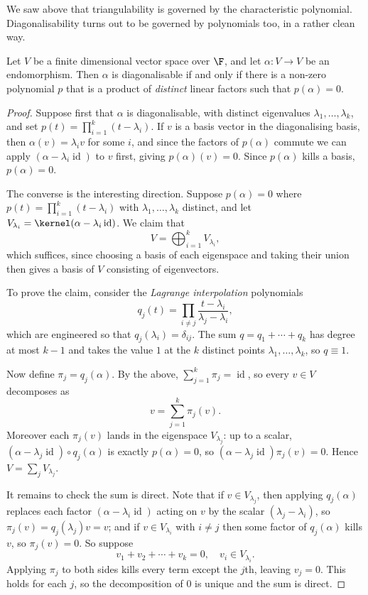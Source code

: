 We saw above that triangulability is governed by the characteristic polynomial. Diagonalisability turns out to be governed by polynomials too, in a rather clean way.

\begin{theorem}
    Let $V$ be a finite dimensional vector space over $\F$, and let $\alpha: V \rightarrow V$ be an endomorphism. Then $\alpha$ is diagonalisable if and only if there is a non-zero polynomial $p$ that is a product of \emph{distinct} linear factors such that $p(\alpha) = 0$.
\end{theorem}
\begin{proof}
    Suppose first that $\alpha$ is diagonalisable, with distinct eigenvalues $\lambda_1, \dots, \lambda_k$, and set $p(t) = \prod_{i = 1}^k (t - \lambda_i)$. If $v$ is a basis vector in the diagonalising basis, then $\alpha(v) = \lambda_i v$ for some $i$, and since the factors of $p(\alpha)$ commute we can apply $(\alpha - \lambda_i \operatorname{id})$ to $v$ first, giving $p(\alpha)(v) = 0$. Since $p(\alpha)$ kills a basis, $p(\alpha) = 0$.

    The converse is the interesting direction. Suppose $p(\alpha) = 0$ where $p(t) = \prod_{i = 1}^k (t - \lambda_i)$ with $\lambda_1, \dots, \lambda_k$ distinct, and let $V_{\lambda_i} = \kernel (\alpha - \lambda_i \operatorname{id})$. We claim that
    $$
    V = \bigoplus_{i = 1}^k V_{\lambda_i},
    $$
    which suffices, since choosing a basis of each eigenspace and taking their union then gives a basis of $V$ consisting of eigenvectors.

    To prove the claim, consider the \emph{Lagrange interpolation} polynomials
    $$
    q_j(t) = \prod_{i \neq j} \frac{t - \lambda_i}{\lambda_j - \lambda_i},
    $$
    which are engineered so that $q_j(\lambda_i) = \delta_{ij}$. The sum $q = q_1 + \cdots + q_k$ has degree at most $k - 1$ and takes the value $1$ at the $k$ distinct points $\lambda_1, \dots, \lambda_k$, so $q \equiv 1$.

    Now define $\pi_j = q_j(\alpha)$. By the above, $\sum_{j = 1}^k \pi_j = \operatorname{id}$, so every $v \in V$ decomposes as
    $$
    v = \sum_{j = 1}^k \pi_j (v).
    $$
    Moreover each $\pi_j(v)$ lands in the eigenspace $V_{\lambda_j}$: up to a scalar, $(\alpha - \lambda_j \operatorname{id}) \circ q_j(\alpha)$ is exactly $p(\alpha) = 0$, so $(\alpha - \lambda_j \operatorname{id})\pi_j(v) = 0$. Hence $V = \sum_{j} V_{\lambda_j}$.

    It remains to check the sum is direct. Note that if $v \in V_{\lambda_j}$, then applying $q_j(\alpha)$ replaces each factor $(\alpha - \lambda_i\operatorname{id})$ acting on $v$ by the scalar $(\lambda_j - \lambda_i)$, so $\pi_j(v) = q_j(\lambda_j) v = v$; and if $v \in V_{\lambda_i}$ with $i \neq j$ then some factor of $q_j(\alpha)$ kills $v$, so $\pi_j(v) = 0$. So suppose
    $$
    v_1 + v_2 + \cdots + v_k = 0, \quad v_i \in V_{\lambda_i}.
    $$
    Applying $\pi_j$ to both sides kills every term except the $j$th, leaving $v_j = 0$. This holds for each $j$, so the decomposition of $0$ is unique and the sum is direct.
\end{proof}

